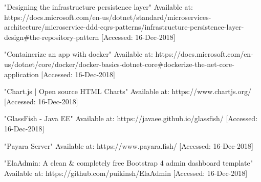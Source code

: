  "Designing the infrastructure persistence layer" Available at: https://docs.microsoft.com/en-us/dotnet/standard/microservices-architecture/microservice-ddd-cqrs-patterns/infrastructure-persistence-layer-design\#the-repository-pattern [Accessed: 16-Dec-2018]

 "Containerize an app with docker" Available at: https://docs.microsoft.com/en-us/dotnet/core/docker/docker-basics-dotnet-core\#dockerize-the-net-core-application [Accessed: 16-Dec-2018]

 "Chart.js | Open source HTML Charts" Available at: https://www.chartjs.org/ [Accessed: 16-Dec-2018]

 "GlassFish - Java EE" Available at: https://javaee.github.io/glassfish/ [Accessed: 16-Dec-2018]

 "Payara Server" Available at: https://www.payara.fish/ [Accessed: 16-Dec-2018]

 "ElaAdmin: A clean \& completely free Bootstrap 4 admin dashboard template" Available at: https://github.com/puikinsh/ElaAdmin [Accessed: 16-Dec-2018]
